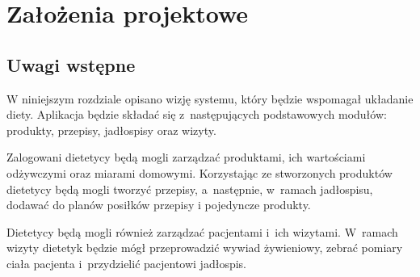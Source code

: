 \chapter{Założenia projektowe}\label{ch:design-assumptions}
\section{Uwagi wstępne}\label{sec:presumptions}
W niniejszym rozdziale opisano wizję systemu, który będzie wspomagał układanie diety. Aplikacja
będzie składać się z~następujących podstawowych modułów: produkty, przepisy, jadłospisy
oraz wizyty.
\par
Zalogowani dietetycy będą mogli zarządzać produktami, ich wartościami odżywczymi oraz
miarami domowymi. Korzystając ze stworzonych produktów dietetycy będą mogli tworzyć
przepisy, a~następnie, w~ramach jadłospisu, dodawać do planów posiłków przepisy
i pojedyncze produkty.
\par
Dietetycy będą mogli również zarządzać pacjentami i~ich wizytami. W~ramach wizyty dietetyk
będzie mógł przeprowadzić wywiad żywieniowy, zebrać pomiary ciała pacjenta i~przydzielić
pacjentowi jadłospis.



